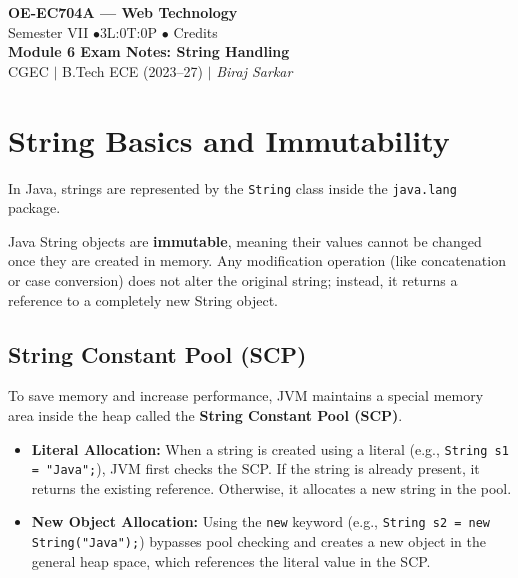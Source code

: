 \documentclass[12pt,a4paper]{article}
\begin{document}

\begin{center}
  {\LARGE\bfseries\color{myred} OE-EC704A --- Web Technology}\\[5pt]
  {\normalsize\color{mydark} Semester VII \quad$\bullet$\quad 3L:0T:0P \quad$\bullet$ Credits}\\[3pt]
  {\normalsize\color{myteal}\textbf{Module 6 Exam Notes: String Handling}}\\[3pt]
  {\small\color{mydark} CGEC \;$|$\; B.Tech ECE (2023--27) \;$|$\; \textit{Biraj Sarkar}}
\end{center}
\noindent{\color{myred}\rule{\linewidth}{1.5pt}}
\vspace{2pt}

\hypersetup{linkcolor=mydark}
\tableofcontents
\hypersetup{linkcolor=myteal}
\newpage

\section{String Basics and Immutability}

In Java, strings are represented by the \texttt{String} class inside the \texttt{java.lang} package. 

\begin{tcolorbox}[defbox, title={\textbf{String Immutability Concept}}]
Java String objects are \textbf{immutable}, meaning their values cannot be changed once they are created in memory. Any modification operation (like concatenation or case conversion) does not alter the original string; instead, it returns a reference to a completely new String object.
\end{tcolorbox}

\subsection{String Constant Pool (SCP)}
To save memory and increase performance, JVM maintains a special memory area inside the heap called the \textbf{String Constant Pool (SCP)}.
\begin{itemize}[leftmargin=*, itemsep=3.5pt]
  \item \textbf{Literal Allocation:} When a string is created using a literal (e.g., \texttt{String s1 = "Java";}), JVM first checks the SCP. If the string is already present, it returns the existing reference. Otherwise, it allocates a new string in the pool.
  \item \textbf{New Object Allocation:} Using the \texttt{new} keyword (e.g., \texttt{String s2 = new String("Java");}) bypasses pool checking and creates a new object in the general heap space, which references the literal value in the SCP.
\end{itemize}
\end{document}
